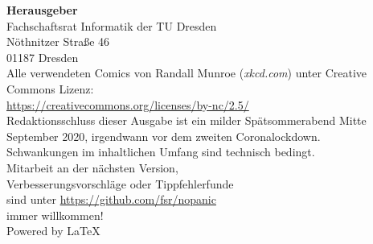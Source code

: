 \newpage
\thispagestyle{empty} %
\color{white}

\begin{minipage}[t][\textheight][b]{.65\textwidth}
\footnotesize
\textbf{Herausgeber} \\
Fachschaftsrat Informatik der TU Dresden\\
Nöthnitzer Straße 46\\
01187 Dresden\\[1\baselineskip]

Alle verwendeten Comics von Randall Munroe (\textit{xkcd.com}) unter Creative Commons Lizenz:\\
\url{https://creativecommons.org/licenses/by-nc/2.5/}\\[1\baselineskip]

Redaktionsschluss dieser Ausgabe ist ein milder Spätsommerabend Mitte September 2020, irgendwann vor dem zweiten Coronalockdown.\\%
Schwankungen im inhaltlichen Umfang sind technisch bedingt.\\[1\baselineskip]

Mitarbeit an der nächsten Version,\\
Verbesserungsvorschläge oder Tippfehlerfunde\\
sind unter \url{https://github.com/fsr/nopanic}\\
immer willkommen!\\[1\baselineskip]

Powered by \LaTeX
\end{minipage}%
\hfill%
